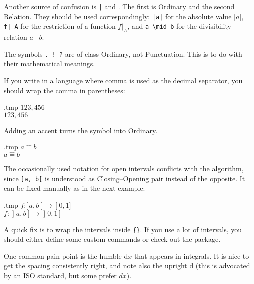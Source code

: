\begin{gotcha}
Another source of confusion is \verb.|. and .
The first is Ordinary and the second Relation.
They should be used correspondingly:
\verb.|a|. for the absolute value $|a|$,
\verb.f|_A. for the restriction of a function $f|_A$,
and \verb.a \mid b. for the divisibility relation $a \mid b$.
\end{gotcha}

\begin{gotcha}
The symbols \verb|. ! ?| are of class Ordinary, not Punctuation.
This is to do with their mathematical meanings.
\end{gotcha}

\begin{gotcha}
If you write in a language where comma is used as the decimal separator,
you should wrap the comma in parentheses:
%
\begin{VerbatimOut}{\jobname.tmp}
$123,456$\\
$123{,}456$
\end{VerbatimOut}
\ShowExample
\end{gotcha}

\begin{gotcha}
Adding an accent turns the symbol into Ordinary.
%
\begin{VerbatimOut}{\jobname.tmp}
$a \hat= b$\\
$a \mathrel{\hat=} b$
\end{VerbatimOut}
\ShowExample
\end{gotcha}

\begin{gotcha}
The occasionally used notation for open intervals conflicts with the algorithm,
since \verb|]a, b[| is understood as Closing--Opening pair instead of the opposite.
It can be fixed manually as in the next example:
%
\begin{VerbatimOut}{\jobname.tmp}
$f \colon ]a, b[ \to ]0, 1]$\\
$f \colon \mathopen]a, b\mathclose[
    \to \mathopen]0, 1]$
\end{VerbatimOut}
\ShowExample
%
A quick fix is to wrap the intervals inside \verb|{}|.
If you use a lot of intervals,
you should either define some custom commands or check out the  package.
\end{gotcha}



One common pain point is the humble $\mathrm dx$ that appears in integrals.
It is nice to get the spacing consistently right,
and note also the upright $\mathrm d$ (this is advocated by an ISO standard, but some prefer $dx$).

